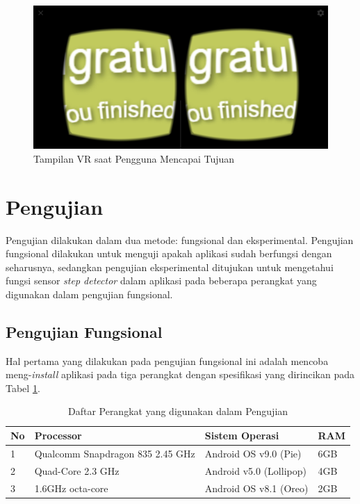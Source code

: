 \begin{figure}
\centering
\includegraphics[scale=0.15]{Gambar/finished-page.png}
    \caption{Tampilan VR saat Pengguna Mencapai Tujuan}
    \label{fig:finished-page}
\end{figure}

\section{Pengujian}
Pengujian dilakukan dalam dua metode: fungsional dan eksperimental. Pengujian fungsional dilakukan untuk menguji apakah aplikasi sudah berfungsi dengan seharusnya, sedangkan pengujian eksperimental ditujukan untuk mengetahui fungsi sensor \textit{step detector} dalam aplikasi pada beberapa perangkat yang digunakan dalam pengujian fungsional.

\subsection{Pengujian Fungsional}
\label{subs:fungtional-test}
Hal pertama yang dilakukan pada pengujian fungsional ini adalah mencoba meng-\textit{install} aplikasi pada tiga perangkat dengan spesifikasi yang dirincikan pada Tabel \ref{tab:hardware-test}. 

\begin{table}[]
    \centering
    \caption{Daftar Perangkat yang digunakan dalam Pengujian}
    \begin{tabular}{|p{1cm}||p{4cm}|p{4cm}|p{3cm}|}
    \hline
       No  & Processor & Sistem Operasi & RAM \\
    \hline
        1 &  Qualcomm Snapdragon 835 2.45 GHz & Android OS v9.0 (Pie) & 6GB\\
    \hline
        2 &  Quad-Core 2.3 GHz & Android v5.0 (Lollipop) & 4GB \\
    \hline
        3 &  1.6GHz octa-core & Android OS v8.1 (Oreo) & 2GB\\
    \hline
    \end{tabular}
    \label{tab:hardware-test}
\end{table}

